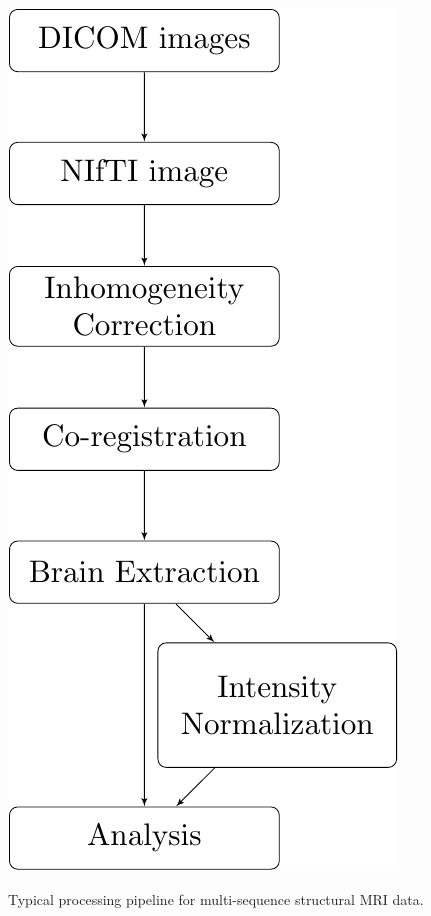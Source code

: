 \documentclass[]{elsarticle} %
\begin{document}
\begin{figure}[!ht]
  \begin{center}
    \caption{Typical processing pipeline for multi-sequence structural MRI data.}
    \includegraphics{figures/Imaging_Pipeline_Flowchart.pdf}
    \label{fig:flow}
  \end{center}
\end{figure}
\end{document}
